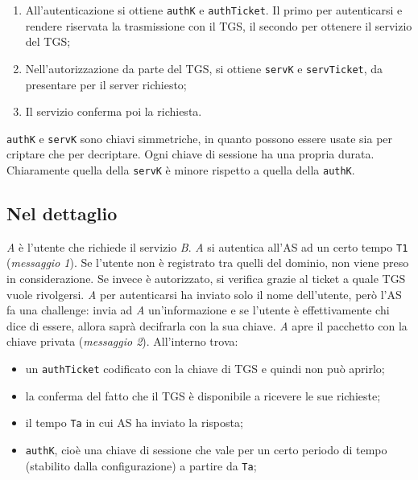 \begin{enumerate}
      \item All’autenticazione si ottiene \verb|authK| e \verb|authTicket|.
            Il primo per autenticarsi e rendere
            riservata la trasmissione con il TGS, il secondo per ottenere
            il servizio del TGS;
      \item Nell’autorizzazione da parte del TGS, si ottiene \verb|servK| e
            \verb|servTicket|, da presentare per il
            server richiesto;
      \item Il servizio conferma poi la richiesta.
\end{enumerate}

\verb|authK| e \verb|servK| sono chiavi simmetriche, in quanto possono essere
usate sia per criptare che per decriptare. Ogni chiave di sessione ha una
propria durata.
Chiaramente quella della \verb|servK| è minore rispetto a quella
della \verb|authK|.

\subsection{Nel dettaglio}

\textit{A} è l’utente che richiede il servizio \textit{B}.
\textit{A} si autentica all’AS ad un certo tempo \verb|T1|
(\textit{messaggio 1}). Se l’utente non è registrato tra quelli del dominio,
non viene preso in considerazione. Se invece è autorizzato, si verifica grazie
al ticket a quale TGS vuole rivolgersi.
\textit{A} per autenticarsi ha inviato solo il nome dell’utente, però l’AS fa
una challenge: invia ad \textit{A} un’informazione e se l’utente è
effettivamente chi dice di essere, allora saprà decifrarla con la sua chiave.
\textit{A} apre il pacchetto con la chiave privata (\textit{messaggio 2}).
All’interno trova:

\begin{itemize}
      \item un \verb|authTicket| codificato con la chiave di TGS e quindi non può
            aprirlo;
      \item la conferma del fatto che il TGS è disponibile a ricevere le sue
            richieste;
      \item il tempo \verb|Ta| in cui AS ha inviato la risposta;
      \item \verb|authK|, cioè una chiave di sessione che vale per un certo periodo di
            tempo (stabilito dalla configurazione) a partire da \verb|Ta|;
\end{itemize}

